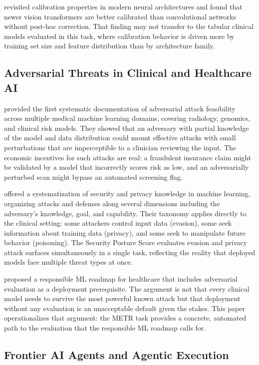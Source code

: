 \documentclass[11pt]{article}
\begin{document}
\citet{minderer2021revisiting} revisited calibration properties in modern
neural architectures and found that newer vision transformers are better
calibrated than convolutional networks without post-hoc correction. That
finding may not transfer to the tabular clinical models evaluated in this
task, where calibration behavior is driven more by training set size and
feature distribution than by architecture family.

\subsection{Adversarial Threats in Clinical and Healthcare AI}

\citet{finlayson2019adversarial} provided the first systematic documentation
of adversarial attack feasibility across multiple medical machine learning
domains, covering radiology, genomics, and clinical risk models. They showed
that an adversary with partial knowledge of the model and data distribution
could mount effective attacks with small perturbations that are imperceptible
to a clinician reviewing the input. The economic incentives for such attacks
are real: a fraudulent insurance claim might be validated by a model that
incorrectly scores risk as low, and an adversarially perturbed scan might
bypass an automated screening flag.

\citet{papernot2018sok} offered a systematization of security and privacy
knowledge in machine learning, organizing attacks and defenses along several
dimensions including the adversary's knowledge, goal, and capability.
Their taxonomy applies directly to the clinical setting: some attackers
control input data (evasion), some seek information about training data
(privacy), and some seek to manipulate future behavior (poisoning). The
Security Posture Score evaluates evasion and privacy attack surfaces
simultaneously in a single task, reflecting the reality that deployed models
face multiple threat types at once.

\citet{wiens2019no} proposed a responsible ML roadmap for healthcare that
includes adversarial evaluation as a deployment prerequisite. The argument is
not that every clinical model needs to survive the most powerful known attack
but that deployment without any evaluation is an unacceptable default
given the stakes. This paper operationalizes that argument: the METR task
provides a concrete, automated path to the evaluation that the responsible ML
roadmap calls for.

\subsection{Frontier AI Agents and Agentic Execution}
\end{document}
